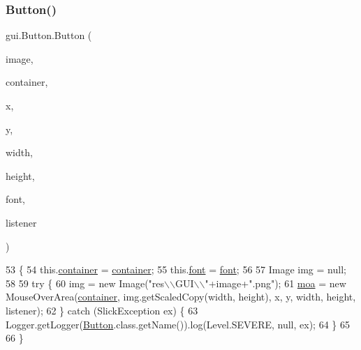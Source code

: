 \subsubsection{\texorpdfstring{Button()}{Button()}\hspace{0.1cm}{\footnotesize\ttfamily [3/4]}}
{\footnotesize\ttfamily gui.\+Button.\+Button (\begin{DoxyParamCaption}\item[{String}]{image,  }\item[{\mbox{\hyperlink{classorg_1_1newdawn_1_1slick_1_1_game_container}{Game\+Container}}}]{container,  }\item[{int}]{x,  }\item[{int}]{y,  }\item[{int}]{width,  }\item[{int}]{height,  }\item[{\mbox{\hyperlink{classgui_1_1_g_u_i_font}{G\+U\+I\+Font}}}]{font,  }\item[{\mbox{\hyperlink{interfaceorg_1_1newdawn_1_1slick_1_1gui_1_1_component_listener}{Component\+Listener}}}]{listener }\end{DoxyParamCaption})\hspace{0.3cm}{\ttfamily [inline]}}


\begin{DoxyCode}
53                                                                                                            
                                  \{
54         this.\mbox{\hyperlink{classgui_1_1_button_a91cd8f6ba1fa010f564dcbc4561ce9a7}{container}} = \mbox{\hyperlink{classgui_1_1_button_a91cd8f6ba1fa010f564dcbc4561ce9a7}{container}};
55         this.\mbox{\hyperlink{classgui_1_1_button_a7f22b2fc3bd45d47a55a2d3ef20e5452}{font}} = \mbox{\hyperlink{classgui_1_1_button_a7f22b2fc3bd45d47a55a2d3ef20e5452}{font}};
56 
57         Image img = null;
58 
59         \textcolor{keywordflow}{try} \{
60             img = \textcolor{keyword}{new} Image(\textcolor{stringliteral}{"res\(\backslash\)\(\backslash\)GUI\(\backslash\)\(\backslash\)"}+image+\textcolor{stringliteral}{".png"});
61             \mbox{\hyperlink{classgui_1_1_button_abccfc83b8fee5280bf5022b3b211054e}{moa}} = \textcolor{keyword}{new} MouseOverArea(\mbox{\hyperlink{classgui_1_1_button_a91cd8f6ba1fa010f564dcbc4561ce9a7}{container}}, img.getScaledCopy(width, height), x, y, width, 
      height, listener);
62         \} \textcolor{keywordflow}{catch} (SlickException ex) \{
63             Logger.getLogger(\mbox{\hyperlink{classgui_1_1_button_a9d43604fe7ed9d76404abba348ff731e}{Button}}.class.getName()).log(Level.SEVERE, null, ex);
64         \}
65 
66     \}
\end{DoxyCode}
\mbox{\label{classgui_1_1_button_a9003e70abe9f541a3c2cce5acfcf94aa}} 
